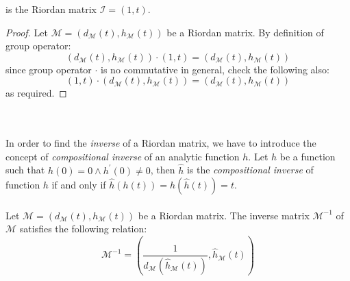 is the Riordan matrix $\mathcal{I}=(1,t)$.
\begin{proof}
    Let $\mathcal{M}=\left(d_{\mathcal{M}}(t),h_{\mathcal{M}}(t)\right)$ be a Riordan matrix.
    By definition of group operator:
    \begin{displaymath}
        \left(d_{\mathcal{M}}(t),h_{\mathcal{M}}(t)\right)\cdot \left(1,t\right) = 
            \left(d_{\mathcal{M}}(t), h_{\mathcal{M}}(t)\right)
    \end{displaymath}
    since group operator $\cdot$ is no commutative in general, check the following also:
    \begin{displaymath}
        \left(1,t\right) \cdot \left(d_{\mathcal{M}}(t),h_{\mathcal{M}}(t)\right)= 
            \left(d_{\mathcal{M}}(t), h_{\mathcal{M}}(t)\right)
    \end{displaymath}
    as required.
\end{proof}
\quad
\\\\
In order to find the \emph{inverse} of a Riordan matrix, we have to
introduce the concept of 
\emph{compositional inverse} of an analytic function $h$.
Let $h$ be a function such that $h(0)=0 \wedge h^{\prime}(0)\neq0$, then
$\hat{h}$ is the \emph{compositional inverse} of function $h$ if and only if 
$\hat{h}(h(t))=h(\hat{h}(t))=t$. 
\\\\
Let $\mathcal{M}=\left(d_{\mathcal{M}}(t),h_{\mathcal{M}}(t)\right)$ be a Riordan matrix.
The inverse matrix $\mathcal{M}^{-1}$ of $\mathcal{M}$ satisfies the following relation:
\begin{displaymath}
    \mathcal{M}^{-1}=\left(
        \frac{1}{d_{\mathcal{M}}(\hat{h}_{\mathcal{M}}(t))}, \hat{h}_{\mathcal{M}}(t)
    \right)
\end{displaymath}

